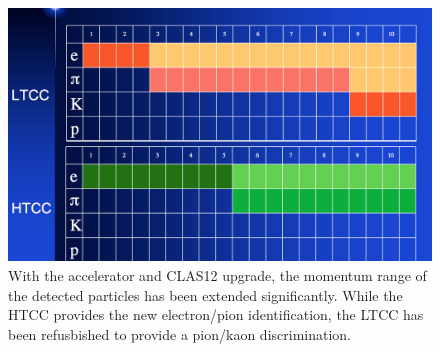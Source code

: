 \begin{figure}[h]
	\centering
	\includegraphics[width=1.0\columnwidth,keepaspectratio]{img/newScope.png}
	\caption{With the accelerator and CLAS12 upgrade, the momentum range of the detected particles has been extended significantly. While the HTCC
            provides the new electron/pion identification, the LTCC has been refusbished to provide a pion/kaon discrimination.}
	\label{fig:newScope}
\end{figure}
